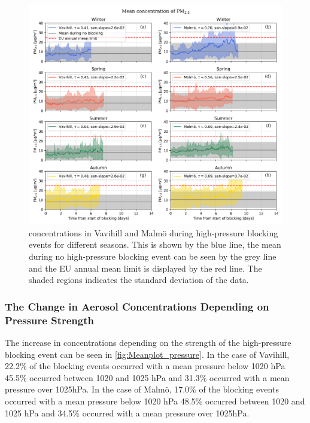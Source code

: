 \begin{figure}[H]
    \centering
    \includegraphics[width=\textwidth]{Figures/Meanplot_seasonal.png}
    \caption{\PM concentrations in Vavihill and Malmö during high-pressure blocking events for different seasons. This is shown by the blue line, the mean during no high-pressure blocking event can be seen by the grey line and the EU annual mean limit is displayed by the red line. The shaded regions indicates the standard deviation of the data.}
    \label{fig:Meanplot_seasonal}
\end{figure}
 
\subsubsection{The Change in Aerosol Concentrations Depending on Pressure Strength}
The increase in \PM  concentrations depending on the strength of the high-pressure blocking event can be seen in \autoref{fig:Meanplot_pressure}. In the case of Vavihill, 22.2\% of the blocking events occurred with a mean pressure below 1020 hPa 45.5\% occurred between 1020 and 1025 hPa and 31.3\% occurred with a mean pressure over 1025hPa. In the case of Malmö, 17.0\% of the blocking events occurred with a mean pressure below 1020 hPa 48.5\% occurred between 1020 and 1025 hPa and 34.5\% occurred with a mean pressure over 1025hPa.


